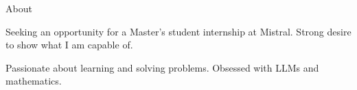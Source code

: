 \begin{rubric}{About}
\noentry{~}

\begin{minipage}[t]{\textwidth}
Seeking an opportunity for a Master's student internship at Mistral. Strong desire to show what I am capable of. 

Passionate about learning and solving problems.
Obsessed with LLMs and mathematics.
\end{minipage}

\end{rubric}


